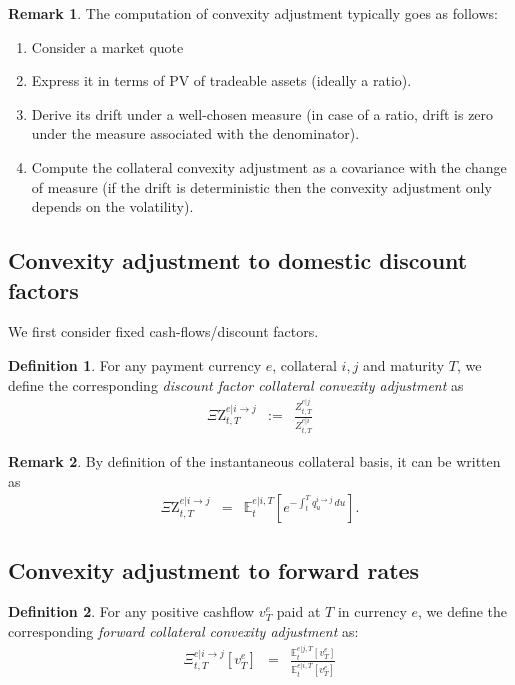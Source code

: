 \documentclass[11pt,english]{amsart}
\newcommand{\EE}{\mathbb{E}}
\newcommand{\Q}{\Xi}
\newcommand{\QZ}{{\Xi\mathrm{Z}}}
\theoremstyle{definition}
\newtheorem{defi}{Definition}
\newtheorem{rema}{Remark}
\begin{document}
\begin{rema}
The computation of convexity adjustment typically goes as follows:  
\begin{enumerate}
\item Consider a market quote
\item Express it in terms of PV of tradeable assets (ideally a ratio).
\item Derive its drift under a well-chosen measure (in case of a ratio, drift is zero under the measure associated with the denominator).
\item Compute the collateral convexity adjustment as a covariance with the change of measure (if the drift is deterministic then the convexity adjustment only depends on the volatility).  
\end{enumerate}
\end{rema}


\subsection{Convexity adjustment to domestic discount factors}
We first consider fixed cash-flows/discount factors.


\begin{defi}
For any payment currency $e$, collateral $i,j$ and maturity $T$, we define the corresponding \emph{discount factor  collateral convexity adjustment} as 
\begin{eqnarray}
  \QZ^{e|i\to j}_{t,T}   &:=& \frac{ Z^{e|j}_{t,T} } { Z^{e|i}_{t,T} } 
\end{eqnarray}
\end{defi}

\begin{rema}
By definition of the instantaneous collateral basis, it can be written as
\begin{eqnarray}
  \QZ^{e|i\to j}_{t,T} &=& \EE^{e|i,T}_t\left[ e^{-\int_t^T q^{i\to j}_u \,du}  \right]  .
\end{eqnarray}
\end{rema}






\subsection{Convexity adjustment to forward rates}


\begin{defi}
For any positive cashflow $v^e_T$ paid at $T$ in currency $e$, we define the corresponding \emph{forward collateral convexity adjustment} as:
\begin{eqnarray}
  \Q^{e|i\to j}_{t,T}[v^e_T] &=& \frac{\EE^{e|j,T}_t\left[ v^e_T \right] } {\EE^{e|i,T}_t\left[ v^e_T \right] }  
\end{eqnarray}
\end{defi}
\end{document}
